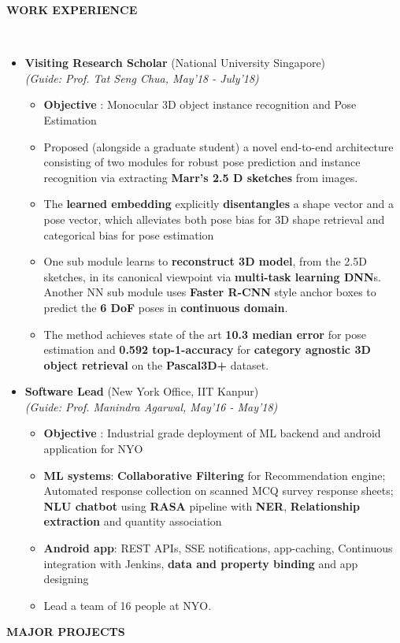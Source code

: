 \documentclass[a4paper,10pt]{article}
\newcommand{\isep}{-2 pt}
\newcommand{\lsep}{-0.5cm}
\newcommand{\resheading}[1]{{\small \colorbox{mygrey}{\begin{minipage}{0.975\textwidth}{\textbf{#1 \vphantom{p\^{E}}}}\end{minipage}}}}
\begin{document}
\resheading{\textbf{WORK EXPERIENCE} }\\[\lsep]
\begin{itemize}
\item \textbf{Visiting Research Scholar} (National University Singapore)\\
 \emph{(Guide: Prof. Tat Seng Chua, May'18 - July'18)} \\[-0.6cm]
	\begin{itemize}\itemsep \isep
	\item \textbf{Objective} : Monocular 3D object instance recognition and Pose Estimation
	\item Proposed (alongside a graduate student) a novel end-to-end architecture consisting of two modules for robust pose prediction and instance recognition via extracting \textbf{Marr's 2.5 D sketches} from images.
	\item The \textbf{learned embedding} explicitly \textbf{disentangles} a shape vector and a pose vector, which alleviates both pose bias for 3D shape retrieval and categorical bias for pose estimation
	\item One sub module learns to \textbf{reconstruct 3D model}, from the 2.5D sketches, in its canonical viewpoint via \textbf{multi-task learning DNN}s. Another NN sub module uses \textbf{Faster R-CNN} style anchor boxes to predict the \textbf{6 DoF} poses in \textbf{continuous domain}.
	\item The method achieves state of the art \textbf{10.3
median error} for pose estimation and \textbf{0.592 top-1-accuracy}
for \textbf{category agnostic 3D object retrieval} on the \textbf{Pascal3D+}
dataset.
	\end{itemize}

\item \textbf{Software Lead} (New York Office, IIT Kanpur)\\
 \emph{(Guide: Prof. Manindra Agarwal, May'16 - May'18)} \\[-0.6cm]
	\begin{itemize}\itemsep \isep
		\item \textbf{Objective} : Industrial grade deployment of ML backend and android application for NYO
	\item \textbf{ML systems}: \textbf{Collaborative Filtering} for Recommendation engine; Automated response collection on scanned MCQ survey response sheets;\textbf{ NLU chatbot} using \textbf{RASA} pipeline with \textbf{NER}, \textbf{Relationship extraction} and quantity association
	\item \textbf{Android app}: REST APIs, SSE notifications, app-caching, Continuous integration with Jenkins, \textbf{data and property binding} and app designing 
	\item Lead a team of 16 people at NYO.
	\end{itemize}
\end{itemize}
\vspace{0.2in}
\resheading{\textbf{MAJOR PROJECTS} }\\[\lsep]
\end{document}
